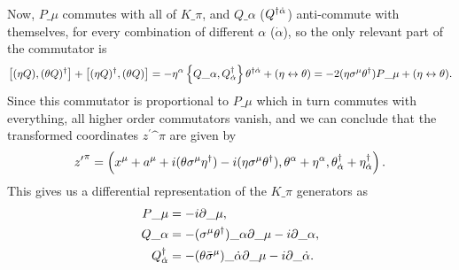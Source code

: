 \documentclass[../main.tex]{subfiles}
\begin{document}
Now, \(P\_\mu\) commutes with all of \(K\_\pi\), and \(Q\_\alpha\) (\(Q\indices*{^\dagger^{\dot\alpha}}\)) anti-commute with themselves, for every combination of different \(\alpha\) (\(\dot\alpha\)), so the only relevant part of the commutator is
\begin{equation}
    \commutator{(\eta Q)}{(\theta Q)^\dagger} + \commutator{(\eta Q)^\dagger}{(\theta Q)} = -\eta\^\alpha \anticommutator{Q\_\alpha}{Q\indices*{^\dagger_{\dot\alpha}}} \theta\indices*{^\dagger^{\dot\alpha}} + (\eta \leftrightarrow \theta) = -2(\eta \sigma\^\mu \theta^\dagger)P\_\mu + (\eta \leftrightarrow \theta).
\end{equation}
Since this commutator is proportional to \(P\_\mu\) which in turn commutes with everything, all higher order commutators vanish, and we can conclude that the transformed coordinates \({z^\prime}\^\pi\) are given by
\begin{equation}
    {z^\prime}\^\pi = \pclosed{x\^\mu + a\^\mu + i(\theta \sigma\^\mu \eta^\dagger) - i(\eta \sigma\^\mu \theta^\dagger), \theta\^\alpha + \eta\^\alpha, \theta\indices*{^\dagger_{\dot\alpha}} + \eta\indices*{^\dagger_{\dot\alpha}}}.
\end{equation}
This gives us a differential representation of the \(K\_\pi\) generators as
\begin{subequations}
    \begin{align}
        P\_\mu                            & = -i \partial\_\mu,                                                                   \\
        Q\_\alpha                         & = - (\sigma\^\mu \theta^\dagger)\_\alpha \partial\_\mu - i \partial\_\alpha,          \\
        Q\indices*{^\dagger_{\dot\alpha}} & = -(\theta \bar{\sigma}\^\mu)\_{\dot\alpha} \partial\_\mu - i \partial\_{\dot\alpha}.
    \end{align}
\end{subequations}
\end{document}

